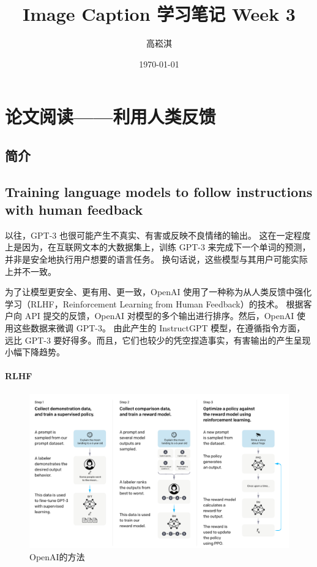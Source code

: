 \documentclass[UTF8]{ctexart}
\title{Image Caption 学习笔记 Week 3}
\author{高崧淇}
\date{\today}
\begin{document}
    \maketitle
    \tableofcontents


    \section{论文阅读——利用人类反馈}

    \subsection{简介}

    \subsection{Training language models to follow instructions with human feedback~\cite{ref_igpt}}
    以往，GPT-3 也很可能产生不真实、有害或反映不良情绪的输出。
    这在一定程度上是因为，在互联网文本的大数据集上，训练 GPT-3 来完成下一个单词的预测，并非是安全地执行用户想要的语言任务。
    换句话说，这些模型与其用户可能实际上并不一致。

    为了让模型更安全、更有用、更一致，OpenAI 使用了一种称为从人类反馈中强化学习（RLHF，Reinforcement Learning from Human Feedback）的技术。
    根据客户向 API 提交的反馈，OpenAI 对模型的多个输出进行排序。然后，OpenAI 使用这些数据来微调 GPT-3。
    由此产生的 InstructGPT 模型，在遵循指令方面，远比 GPT-3 要好得多。而且，它们也较少的凭空捏造事实，有害输出的产生呈现小幅下降趋势。

    \paragraph{RLHF}
    \begin{figure}
        \centering
        \includegraphics[width=\textwidth]{rm}
        \caption{OpenAI的方法}
        \label{fig:rm}
    \end{figure}
\end{document}
